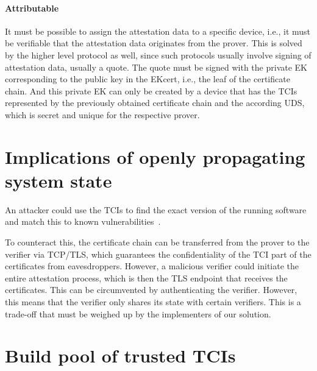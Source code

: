 \paragraph{Attributable}
It must be possible to assign the attestation data to a specific device, i.e., it must be verifiable that the attestation data originates from the prover.
This is solved by the higher level protocol as well, since such protocols usually involve signing of attestation data, usually a quote.
The quote must be signed with the private EK corresponding to the public key in the EKcert, i.e., the leaf of the certificate chain.
And this private EK can only be created by a device that has the TCIs represented by the previously obtained certificate chain and the according UDS, which is secret and unique for the respective prover.



\section{Implications of openly propagating system state}

An attacker could use the TCIs to find the exact version of the running software and match this to known vulnerabilities~\cite{rfc9334}.

To counteract this, the certificate chain can be transferred from the prover to the verifier via TCP/TLS, which guarantees the confidentiality of the TCI part of the certificates from eavesdroppers.
However, a malicious verifier could initiate the entire attestation process, which is then the TLS endpoint that receives the certificates.
This can be circumvented by authenticating the verifier.
However, this means that the verifier only shares its state with certain verifiers.
This is a trade-off that must be weighed up by the implementers of our solution.


\section{Build pool of trusted TCIs}

